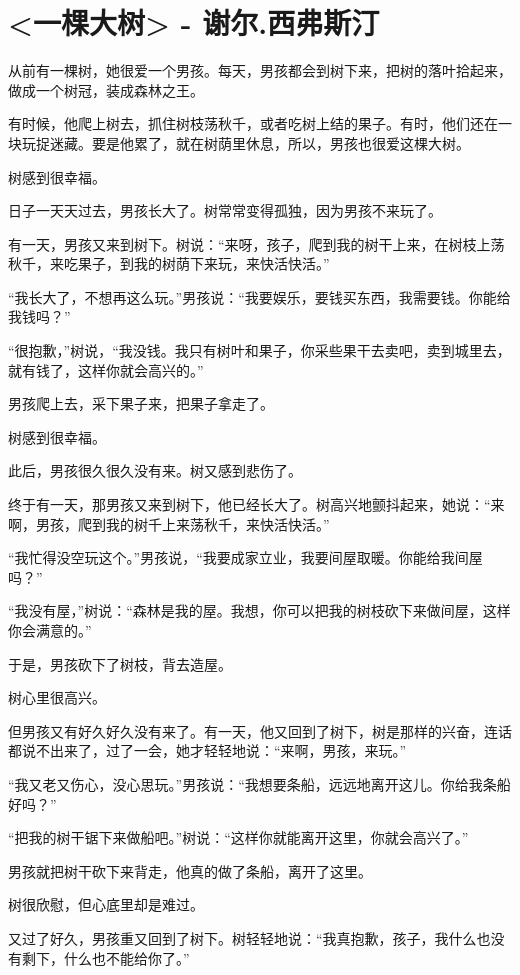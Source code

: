\documentclass[UTF8,a4paper,8pt]{ctexbook}
\begin{document}
\newpage
\section{<一棵大树> - 谢尔.西弗斯汀}
	从前有一棵树，她很爱一个男孩。每天，男孩都会到树下来，把树的落叶拾起来，做成一个树冠，装成森林之王。 
	
	有时候，他爬上树去，抓住树枝荡秋千，或者吃树上结的果子。有时，他们还在一块玩捉迷藏。要是他累了，就在树荫里休息，所以，男孩也很爱这棵大树。 
	
	树感到很幸福。 
	
	日子一天天过去，男孩长大了。树常常变得孤独，因为男孩不来玩了。 
	
	有一天，男孩又来到树下。树说：“来呀，孩子，爬到我的树干上来，在树枝上荡秋千，来吃果子，到我的树荫下来玩，来快活快活。” 
	
	“我长大了，不想再这么玩。”男孩说：“我要娱乐，要钱买东西，我需要钱。你能给我钱吗？” 
	
	“很抱歉，”树说，“我没钱。我只有树叶和果子，你采些果干去卖吧，卖到城里去，就有钱了，这样你就会高兴的。” 
	
	男孩爬上去，采下果子来，把果子拿走了。 
	
	树感到很幸福。 
	
	此后，男孩很久很久没有来。树又感到悲伤了。 
	
	终于有一天，那男孩又来到树下，他已经长大了。树高兴地颤抖起来，她说：“来啊，男孩，爬到我的树千上来荡秋千，来快活快活。” 
	
	“我忙得没空玩这个。”男孩说，“我要成家立业，我要间屋取暖。你能给我间屋吗？” 
	
	“我没有屋，”树说：“森林是我的屋。我想，你可以把我的树枝砍下来做间屋，这样你会满意的。” 
	
	于是，男孩砍下了树枝，背去造屋。 
	
	树心里很高兴。 
	
	但男孩又有好久好久没有来了。有一天，他又回到了树下，树是那样的兴奋，连话都说不出来了，过了一会，她才轻轻地说：“来啊，男孩，来玩。” 
	
	“我又老又伤心，没心思玩。”男孩说：“我想要条船，远远地离开这儿。你给我条船好吗？” 
	
	“把我的树干锯下来做船吧。”树说：“这样你就能离开这里，你就会高兴了。” 
	
	男孩就把树干砍下来背走，他真的做了条船，离开了这里。 
	
	树很欣慰，但心底里却是难过。 
	
	又过了好久，男孩重又回到了树下。树轻轻地说：“我真抱歉，孩子，我什么也没有剩下，什么也不能给你了。” 
	
\end{document}
